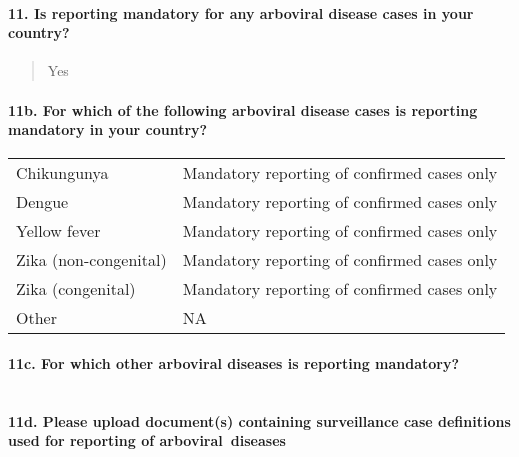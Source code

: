 \documentclass[
]{article}
\begin{document}
\hypertarget{is-reporting-mandatory-for-any-arboviral-disease-cases-in-your-country}{%
\paragraph{11. Is reporting mandatory for any arboviral disease cases in
your
country?}\label{is-reporting-mandatory-for-any-arboviral-disease-cases-in-your-country}}

\begin{quote}
Yes
\end{quote}

\hypertarget{b.-for-which-of-the-following-arboviral-disease-cases-is-reporting-mandatory-in-your-country}{%
\paragraph{11b. For which of the following arboviral disease cases is
reporting mandatory in your
country?}\label{b.-for-which-of-the-following-arboviral-disease-cases-is-reporting-mandatory-in-your-country}}

\begin{longtable}[]{@{}ll@{}}
\toprule
\endhead
Chikungunya & Mandatory reporting of confirmed cases only \\
Dengue & Mandatory reporting of confirmed cases only \\
Yellow fever & Mandatory reporting of confirmed cases only \\
Zika (non-congenital) & Mandatory reporting of confirmed cases only \\
Zika (congenital) & Mandatory reporting of confirmed cases only \\
Other & NA \\
\bottomrule
\end{longtable}

\hypertarget{c.-for-which-other-arboviral-diseases-is-reporting-mandatory}{%
\paragraph{11c. For which other arboviral diseases is reporting
mandatory?}\label{c.-for-which-other-arboviral-diseases-is-reporting-mandatory}}

\begin{longtable}[]{@{}lll@{}}
\toprule
\endhead
\bottomrule
\end{longtable}

\hypertarget{d.-please-upload-documents-containing-surveillance-case-definitions-used-for-reporting-of-arboviral-diseases}{%
\paragraph{11d. Please upload document(s) containing surveillance case
definitions used for reporting of
arboviral~diseases}\label{d.-please-upload-documents-containing-surveillance-case-definitions-used-for-reporting-of-arboviral-diseases}}
\end{document}
